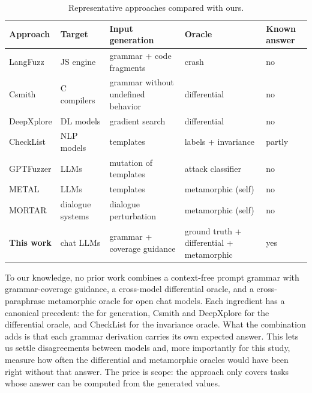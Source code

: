 \begin{table}[ht]
\centering
\caption{Representative approaches compared with ours.}
\label{tab:related}
\footnotesize\setlength{\tabcolsep}{3pt}
\begin{tabularx}{\linewidth}{@{}>{\raggedright\arraybackslash}p{2.3cm} >{\raggedright\arraybackslash}p{1.9cm} >{\raggedright\arraybackslash}X >{\raggedright\arraybackslash}p{2.9cm} >{\centering\arraybackslash}p{1.3cm}@{}}
\toprule
Approach & Target & Input generation & Oracle & Known answer \\
\midrule
LangFuzz \citeyearpar{holler2012langfuzz} & JS engine & grammar + code fragments & crash & no \\
Csmith \citeyearpar{yang2011csmith} & C compilers & grammar without undefined behavior & differential & no \\
DeepXplore \citeyearpar{pei2017deepxplore} & DL models & gradient search & differential & no \\
CheckList \citeyearpar{ribeiro2020checklist} & NLP models & templates & labels + invariance & partly \\
GPTFuzzer \citeyearpar{yu2023gptfuzzer} & LLMs & mutation of templates & attack classifier & no \\
METAL \citeyearpar{hyun2024metal} & LLMs & templates & metamorphic (self) & no \\
MORTAR \citeyearpar{guo2026mortar} & dialogue systems & dialogue perturbation & metamorphic (self) & no \\
\textbf{This work} & chat LLMs & grammar + coverage guidance & ground truth + differential + metamorphic & yes \\
\bottomrule
\end{tabularx}
\end{table}

To our knowledge, no prior work combines a context-free prompt grammar with grammar-coverage guidance, a cross-model differential oracle, and a cross-paraphrase metamorphic oracle for open chat models. Each ingredient has a canonical precedent: the  for generation, Csmith and DeepXplore for the differential oracle, and CheckList for the invariance oracle. What the combination adds is that each grammar derivation carries its own expected answer. This lets us settle disagreements between models and, more importantly for this study, measure how often the differential and metamorphic oracles would have been right without that answer. The price is scope: the approach only covers tasks whose answer can be computed from the generated values.
